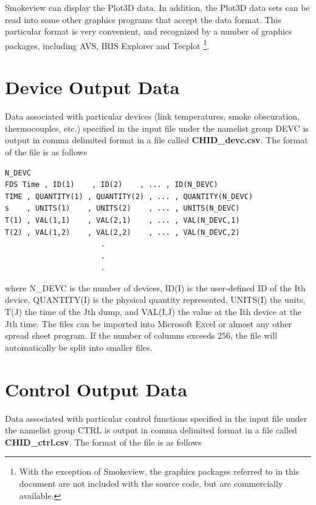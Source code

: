 \documentclass[11pt]{book}
\begin{document}
Smokeview can display the Plot3D data. In
addition, the Plot3D data sets can be read into some other graphics
programs that accept the data format.
This particular format is very convenient, and recognized by
a number of graphics packages, including AVS, IRIS Explorer
and Tecplot
\footnote{With the exception of Smokeview,
the graphics packages referred to in this document are
not included with the source code, but are commercially available.}.

\section{Device Output Data}
\label{out:DEVC}

Data associated with particular devices (link temperatures, smoke obscuration, thermocouples, etc.)
specified in the input file under the namelist
group {\ct DEVC} is output in comma delimited format in a file called
{\bf CHID\_devc.csv}. The format of the file is as follows

\footnotesize
\begin{verbatim}
N_DEVC
FDS Time , ID(1)    , ID(2)    , ... , ID(N_DEVC)
TIME , QUANTITY(1) , QUANTITY(2) , ... , QUANTITY(N_DEVC)
s    , UNITS(1)    , UNITS(2)    , ... , UNITS(N_DEVC)
T(1) , VAL(1,1)    , VAL(2,1)    , ... , VAL(N_DEVC,1)
T(2) , VAL(1,2)    , VAL(2,2)    , ... , VAL(N_DEVC,2)
                      .
                      .
                      .
\end{verbatim}
\normalsize
where {\ct N\_DEVC} is the number of devices, {\ct ID(I)} is the user-defined
ID of the {\ct I}th device, {\ct QUANTITY(I)} is the physical quantity represented, {\ct UNITS(I)} the
units, {\ct T(J)} the time of the {\ct J}th dump, and
{\ct VAL(I,J)} the value at the {\ct I}th device at the {\ct J}th time.
The files can be imported into Microsoft Excel or almost any other
spread sheet program. If the number of columns exceeds 256, the file will automatically be split into smaller files.

\section{Control Output Data}
\label{out:CTRL}

Data associated with particular control functions specified in the input file under the
namelist group {\ct CTRL} is output in comma delimited format in a file called
{\bf CHID\_ctrl.csv}. The format of the file is as follows
\end{document}
